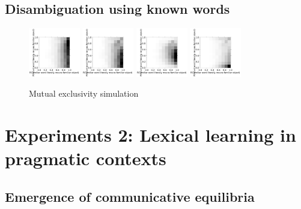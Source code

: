 \documentclass{article} %
\begin{document}
\subsection{Disambiguation using known words}


\begin{figure}[t]
  \centering
  \includegraphics[width=0.20\textwidth]{figures/ME-1dax.pdf}
  \includegraphics[width=0.20\textwidth]{figures/ME-flat-10dog-10dax.pdf}
  \includegraphics[width=0.20\textwidth]{figures/ME-antisparse-10dog-10dax.pdf}
  \includegraphics[width=0.20\textwidth]{figures/ME-sparse-10dog-10dax.pdf}
  \caption{Mutual exclusivity simulation}
  \label{fig:mutual-exclusivity}
\end{figure}

\section{Experiments 2: Lexical learning in pragmatic contexts}

\subsection{Emergence of communicative equilibria}
\end{document}
